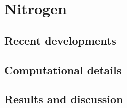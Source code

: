 \chapter{Nitrogen}
\section{Recent developments}
\section{Computational details}
\section{Results and discussion}
